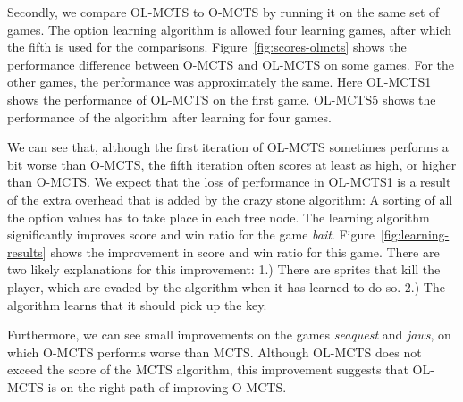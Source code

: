 Secondly, we compare OL-MCTS to O-MCTS by running it on the same set of games.
The option learning algorithm is allowed four learning games, after which the
fifth is used for the comparisons. Figure~\ref{fig:scores-olmcts} shows the
performance difference between O-MCTS and OL-MCTS on some games. For the other
games, the performance was approximately the same. Here OL-MCTS1 shows the
performance of OL-MCTS on the first game. OL-MCTS5 shows the performance of the
algorithm after learning for four games. 

We can see that, although the first iteration of OL-MCTS sometimes performs a
bit worse than O-MCTS, the fifth iteration often scores at least as high, or
higher than O-MCTS\@. We expect that the loss of performance in OL-MCTS1 is
a result of the extra overhead that is added by the crazy stone algorithm: A
sorting of all the option values has to take place in each tree node. The
learning algorithm significantly improves score and win ratio for the game
\textit{bait}.
Figure~\ref{fig:learning-results} shows the improvement in score and win ratio
for this game. There are two likely explanations for this improvement: 1.) There
are sprites that kill the player, which are evaded by the algorithm when it has
learned to do so.  2.) The algorithm learns that it should pick up the key.

Furthermore, we can see small improvements on the games \textit{seaquest} and
\textit{jaws}, on which O-MCTS performs worse than MCTS\@.  Although OL-MCTS
does not exceed the score of the MCTS algorithm, this improvement suggests
that OL-MCTS is on the right path of improving O-MCTS\@.

